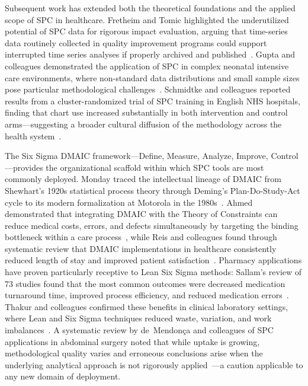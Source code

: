 \documentclass[letterpaper, 10pt, conference]{IEEEconf}
\begin{document}
Subsequent work has extended both the theoretical foundations and the applied
scope of SPC in healthcare.
Fretheim and Tomic highlighted the underutilized potential of SPC data for
rigorous impact evaluation, arguing that time-series data routinely collected
in quality improvement programs could support interrupted time series analyses
if properly archived and published~\cite{Fretheim2015Statistical}.
Gupta and colleagues demonstrated the application of SPC in complex neonatal
intensive care environments, where non-standard data distributions and small
sample sizes pose particular methodological challenges~\cite{Gupta2023Challenging}.
Schmidtke and colleagues reported results from a cluster-randomized trial of
SPC training in English NHS hospitals, finding that chart use increased
substantially in both intervention and control arms---suggesting a broader
cultural diffusion of the methodology across the health
system~\cite{Schmidtke2024Cluster}.

The Six Sigma DMAIC framework---Define, Measure, Analyze, Improve,
Control---provides the organizational scaffold within which SPC tools are most
commonly deployed.
Monday traced the intellectual lineage of DMAIC from Shewhart's 1920s
statistical process theory through Deming's Plan-Do-Study-Act cycle to its
modern formalization at Motorola in the 1980s~\cite{Monday2022Define}.
Ahmed demonstrated that integrating DMAIC with the Theory of Constraints
can reduce medical costs, errors, and defects simultaneously by targeting
the binding bottleneck within a care process~\cite{Ahmed2019Integrating},
while Reis and colleagues found through systematic review that DMAIC
implementations in healthcare consistently reduced length of stay and improved
patient satisfaction~\cite{Reis2023DMAIC}.
Pharmacy applications have proven particularly receptive to Lean Six Sigma
methods: Sallam's review of 73 studies found that the most common outcomes
were decreased medication turnaround time, improved process efficiency, and
reduced medication errors~\cite{Sallam2024Enhancing}.
Thakur and colleagues confirmed these benefits in clinical laboratory settings,
where Lean and Six Sigma techniques reduced waste, variation, and work
imbalances~\cite{Thakur2022Lean}.
A systematic review by de~Mendon\c{c}a and colleagues of SPC applications in
abdominal surgery noted that while uptake is growing, methodological quality
varies and erroneous conclusions arise when the underlying analytical approach
is not rigorously applied~\cite{DeMendonca2024Use}---a caution applicable to
any new domain of deployment.
\end{document}
